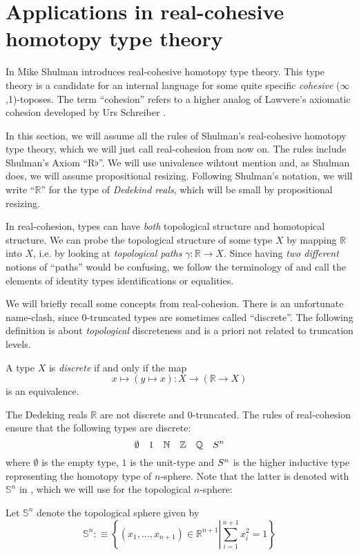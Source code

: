 \documentclass[9pt,twosided]{amsart}
\newcommand{\bN}{\mathbb N}
\newcommand{\bZ}{\mathbb Z}
\newcommand{\bQ}{\mathbb Q}
\newcommand{\bR}{\mathbb R}
\newcommand{\bS}{\mathbb S}
\begin{document}
\section{Applications in real-cohesive homotopy type theory}
\label{subsection:toplogical stacks}

In \cite[Section 8]{ShulmanRealCohesion} Mike Shulman introduces real-cohesive homotopy type theory.
This type theory is a candidate for an internal language for some quite specific \emph{cohesive} ($\infty$,1)-toposes.
The term ``cohesion'' refers to a higher analog 
of Lawvere's axiomatic cohesion \cite{Lawvere07} developed by Urs Schreiber \cite{SchreiberDcct}.

In this section, we will assume all the rules of Shulman's real-cohesive homotopy type theory,
which we will just call real-cohesion from now on.
The rules include Shulman's Axiom ``$\mathrm{R}\flat$''.
We will use univalence wihtout mention and, as Shulman does, we will assume propositional resizing.
Following Shulman's notation, we will write  ``$\bR$'' for the type of \emph{Dedekind reals}, which will be small by propositional resizing.

In real-cohesion, types can have \emph{both} topological structure and homotopical structure.
We can probe the topological structure of some type $X$ by mapping $\bR$ into $X$,
i.e. by looking at \emph{topological paths} $\gamma:\bR\to X$.
Since having \emph{two different} notions of ``paths'' would be confusing,
we follow the terminology of \cite{ShulmanRealCohesion} and call the elements of identity types identifications or equalities.

We will briefly recall some concepts from real-cohesion.
There is an unfortunate name-clash, since 0-truncated types are sometimes called ``discrete''.
The following definition is about \emph{topological} discreteness and is a priori not related to truncation levels.
\begin{defn}
  A type $X$ is \emph{discrete} if and only if the map
  \[ x\mapsto (y\mapsto x) : X \to (\bR \to X) \]
  is an equivalence.
\end{defn}
The Dedeking reals $\bR$ are not discrete and 0-truncated.
The rules of real-cohesion ensure that the following types are discrete:
\[ \emptyset \quad 1 \quad \bN \quad \bZ \quad \bQ \quad \sphere{n} \]
where $\emptyset$ is the empty type,
$1$ is the unit-type and $S^{n}$ is the higher inductive type representing the homotopy type of $n$-sphere.
Note that the latter is denoted with $\bS^n$ in \cite{UFP}, which we will use for the topological $n$-sphere:
\begin{defn}
  Let $\bS^{n}$ denote the topological sphere given by
  \[ \bS^{n}:\equiv\left\{ (x_1,\dots,x_{n+1})\in\bR^{n+1}\left\vert \sum_{i=1}^{n+1}x_i^2=1\right.\right\}\]
\end{defn}
\end{document}
